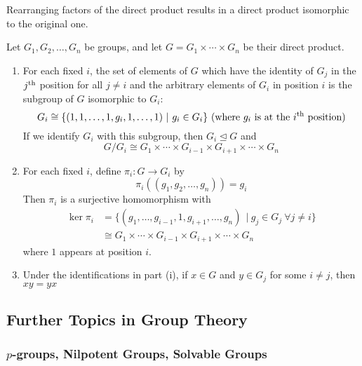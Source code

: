 Rearranging factors of the direct product results in a direct product isomorphic to the original one.

\begin{proposition}
Let $G_1, G_2, \ldots, G_n$ be groups, and let $G = G_1 \times \cdots \times G_n$ be their direct product.
\begin{enumerate}[label=(\roman*)]
\setlength{\itemsep}{0pt}
\item For each fixed $i$, the set of elements of $G$ which have the identity of $G_j$ in the $j^{\textnormal{th}}$ position for all $j \neq i$ and the arbitrary elements of $G_i$ in position $i$ is the subgroup of $G$ isomorphic to $G_i$:
\begin{equation}
G_i \cong \{(1,1,\ldots, 1, g_i, 1, \ldots, 1) \ \vert \ g_i \in G_i\} \textnormal{ (where $g_i$ is at the $i^{\textnormal{th}}$ position)} \nonumber
\end{equation}
If we identify $G_i$ with this subgroup, then $G_i \trianglelefteq G$ and
\begin{equation}
G/G_i \cong G_1 \times \cdots \times G_{i-1} \times G_{i+1} \times \cdots \times G_n \nonumber
\end{equation}
\item For each fixed $i$, define $\pi_i: G \rightarrow G_i$ by
\begin{equation}
\pi_i((g_1 ,g_2, \ldots, g_n)) = g_i \nonumber
\end{equation}
Then $\pi_i$ is a surjective homomorphism with
\begin{align}
\ker{\pi_i} &= \{(g_1, \ldots, g_{i-1}, 1, g_{i+1}, \ldots, g_n)\ \ \vert \ g_j\in G_j \ \forall j\neq i\}\nonumber \\
&\cong G_1 \times \cdots \times G_{i-1} \times G_{i+1} \times \cdots \times G_n \nonumber
\end{align}
where $1$ appears at position $i$. 
\item Under the identifications in part (i), if $x \in G$ and $y \in G_j$ for some $i\neq j$, then $xy = yx$
\end{enumerate}
\end{proposition}

\subsection{Further Topics in Group Theory}

\subsubsection{$p$-groups, Nilpotent Groups, Solvable Groups}


